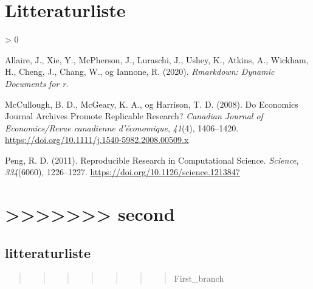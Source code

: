 \documentclass[
  12pt,
  norsk,
]{article}
\newlength{\cslhangindent}
\newenvironment{CSLReferences}[2] %
 {%
  \setlength{\parindent}{0pt}
  \ifodd #1 \everypar{\setlength{\hangindent}{\cslhangindent}}\ignorespaces\fi
  \ifnum #2 > 0
  \setlength{\parskip}{#2\baselineskip}
  \fi
 }%
 {}
\begin{document}
\hypertarget{litteraturliste}{%
\section{Litteraturliste}\label{litteraturliste}}

\hypertarget{refs}{}
\begin{CSLReferences}{1}{0}
\leavevmode\hypertarget{ref-allaire2020}{}%
Allaire, J., Xie, Y., McPherson, J., Luraschi, J., Ushey, K., Atkins,
A., Wickham, H., Cheng, J., Chang, W., og Iannone, R. (2020).
\emph{Rmarkdown: {Dynamic} Documents for r}.

\leavevmode\hypertarget{ref-mccullough2008}{}%
McCullough, B. D., McGeary, K. A., og Harrison, T. D. (2008). Do
Economics Journal Archives Promote Replicable Research? \emph{Canadian
Journal of Economics/Revue canadienne d'économique}, \emph{41}(4),
1406--1420. \url{https://doi.org/10.1111/j.1540-5982.2008.00509.x}

\leavevmode\hypertarget{ref-peng2011}{}%
Peng, R. D. (2011). Reproducible {Research} in {Computational Science}.
\emph{Science}, \emph{334}(6060), 1226--1227.
\url{https://doi.org/10.1126/science.1213847}

\end{CSLReferences}

\hypertarget{second}{%
\section{\textgreater\textgreater\textgreater\textgreater\textgreater\textgreater\textgreater{}
second}\label{second}}

\hypertarget{litteraturliste-1}{%
\subsection{litteraturliste}\label{litteraturliste-1}}

\begin{quote}
\begin{quote}
\begin{quote}
\begin{quote}
\begin{quote}
\begin{quote}
\begin{quote}
First\_branch
\end{quote}
\end{quote}
\end{quote}
\end{quote}
\end{quote}
\end{quote}
\end{quote}
\end{document}
